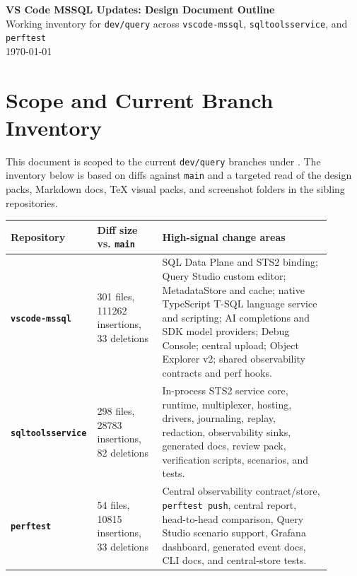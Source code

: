 \documentclass[11pt]{article}
\newcommand{\code}[1]{\texttt{#1}}
\begin{document}
\begin{center}
	{\LARGE\bfseries VS Code MSSQL Updates: Design Document Outline}\\[0.35em]
	{\large Working inventory for \code{dev/query} across \code{vscode-mssql}, \code{sqltoolsservice}, and \code{perftest}}\\[0.35em]
	{\normalsize \today}
\end{center}

\begin{abstract}
This paper should become the consolidated design and usage document for the \code{dev/query} branch family.  It should explain how the STS2 refactor, SQL Data Plane, metadata substrate, Query Studio, native language service, AI completions, Debug Console, central observability, and perftest CLI fit together.  The immediate goal of this draft is an outline plus a source-material index: each section names the existing Markdown, TeX diagrams, code areas, and screenshot folders that should be copied in, edited, or used as figures later.
\end{abstract}

\tableofcontents
\newpage

\section{Scope and Current Branch Inventory}

This document is scoped to the current \code{dev/query} branches under .  The inventory below is based on diffs against \code{main} and a targeted read of the design packs, Markdown docs, TeX visual packs, and screenshot folders in the sibling repositories.

\begin{center}
\begin{tabular}{>{\bfseries}p{0.18\linewidth}p{0.20\linewidth}p{0.52\linewidth}}
Repository & Diff size vs. \code{main} & High-signal change areas \\
\hline
\code{vscode-mssql} & 301 files, 111262 insertions, 33 deletions & SQL Data Plane and STS2 binding; Query Studio custom editor; MetadataStore and cache; native TypeScript T-SQL language service and scripting; AI completions and SDK model providers; Debug Console; central upload; Object Explorer v2; shared observability contracts and perf hooks. \\
\code{sqltoolsservice} & 298 files, 28783 insertions, 82 deletions & In-process STS2 service core, runtime, multiplexer, hosting, drivers, journaling, replay, redaction, observability sinks, generated docs, review pack, verification scripts, scenarios, and tests. \\
\code{perftest} & 54 files, 10815 insertions, 33 deletions & Central observability contract/store, \code{perftest push}, central report, head-to-head comparison, Query Studio scenario support, Grafana dashboard, generated event docs, CLI docs, and central-store tests. \\
\end{tabular}
\end{center}
\end{document}
